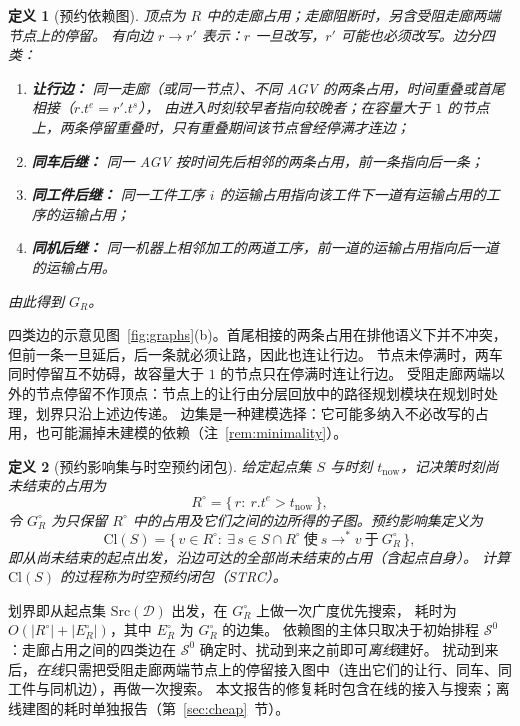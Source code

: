 \documentclass[manuscript,screen,review]{acmart}
\providecommand{\STRC}{\textsc{STRC}}
\newtheorem{definition}{定义}
\begin{document}
\begin{definition}[预约依赖图]
\label{def:dep}
顶点为 \(R\) 中的走廊占用；走廊阻断时，另含受阻走廊两端节点上的停留。
有向边 \(r\to r'\) 表示：\(r\) 一旦改写，\(r'\) 可能也必须改写。边分四类：
\begin{enumerate}[leftmargin=1.4em,itemsep=0.15em]
\item \textbf{让行边：} 同一走廊（或同一节点）、不同 AGV 的两条占用，时间重叠或首尾相接（\(r.t^e=r'.t^s\)），
由进入时刻较早者指向较晚者；在容量大于 \(1\) 的节点上，两条停留重叠时，只有重叠期间该节点曾经停满才连边；
\item \textbf{同车后继：} 同一 AGV 按时间先后相邻的两条占用，前一条指向后一条；
\item \textbf{同工件后继：} 同一工件工序 \(i\) 的运输占用指向该工件下一道有运输占用的工序的运输占用；
\item \textbf{同机后继：} 同一机器上相邻加工的两道工序，前一道的运输占用指向后一道的运输占用。
\end{enumerate}
由此得到 \(G_R\)。
\end{definition}

四类边的示意见图~\ref{fig:graphs}(b)。首尾相接的两条占用在排他语义下并不冲突，
但前一条一旦延后，后一条就必须让路，因此也连让行边。
节点未停满时，两车同时停留互不妨碍，故容量大于 \(1\) 的节点只在停满时连让行边。
受阻走廊两端以外的节点停留不作顶点：节点上的让行由分层回放中的路径规划模块在规划时处理，划界只沿上述边传递。
边集是一种建模选择：它可能多纳入不必改写的占用，也可能漏掉未建模的依赖（注~\ref{rem:minimality}）。

\begin{definition}[预约影响集与时空预约闭包]
\label{def:strc}
给定起点集 \(S\) 与时刻 \(t_{\mathrm{now}}\)，记决策时刻尚未结束的占用为
\[
R^{\circ}=\bigl\{\,r:\ r.t^e>t_{\mathrm{now}}\,\bigr\},
\]
令 \(G_R^\circ\) 为只保留 \(R^{\circ}\) 中的占用及它们之间的边所得的子图。预约影响集定义为
\[
\mathrm{Cl}(S)
=\bigl\{\,v\in R^{\circ}:\
   \exists\,s\in S\cap R^{\circ}\ \text{使}\ s\!\to^*\!v\ \text{于}\ G_R^\circ\,\bigr\},
\]
即从尚未结束的起点出发，沿边可达的全部尚未结束的占用（含起点自身）。
计算 \(\mathrm{Cl}(S)\) 的过程称为时空预约闭包（\STRC）。
\end{definition}

划界即从起点集 \(\mathrm{Src}(\mathcal{D})\) 出发，在 \(G_R^\circ\) 上做一次广度优先搜索，
耗时为 \(O(|R^{\circ}|+|E_R^{\circ}|)\)，其中 \(E_R^{\circ}\) 为 \(G_R^\circ\) 的边集。
依赖图的主体只取决于初始排程 \(\mathcal{S}^0\)：走廊占用之间的四类边在 \(\mathcal{S}^0\) 确定时、扰动到来之前即可\emph{离线}建好。
扰动到来后，\emph{在线}只需把受阻走廊两端节点上的停留接入图中（连出它们的让行、同车、同工件与同机边），再做一次搜索。
本文报告的修复耗时包含在线的接入与搜索；离线建图的耗时单独报告（第~\ref{sec:cheap}~节）。
\end{document}
